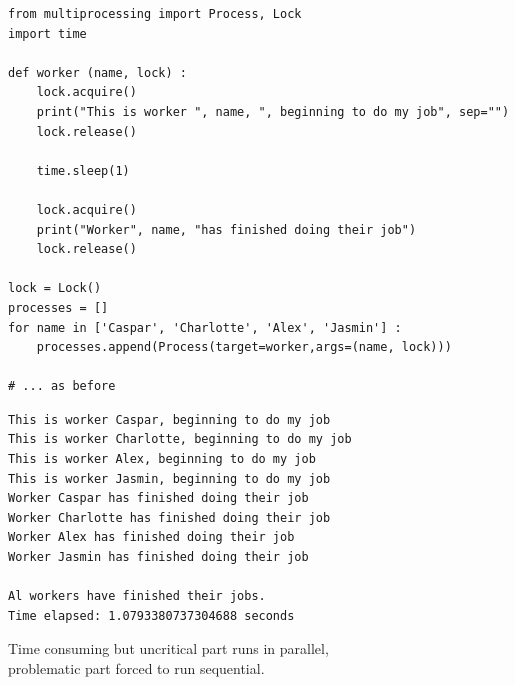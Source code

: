 
\begin{frame}[fragile]
%
\begin{codebox}
\begin{verbatim}
from multiprocessing import Process, Lock
import time

def worker (name, lock) :
    lock.acquire()
    print("This is worker ", name, ", beginning to do my job", sep="")
    lock.release()
    
    time.sleep(1)
    
    lock.acquire()
    print("Worker", name, "has finished doing their job")
    lock.release()

lock = Lock()
processes = []
for name in ['Caspar', 'Charlotte', 'Alex', 'Jasmin'] :
    processes.append(Process(target=worker,args=(name, lock)))

# ... as before
\end{verbatim}
\end{codebox}
%
\end{frame}


\begin{frame}[fragile]
%
\begin{cmdbox}
\begin{verbatim}
This is worker Caspar, beginning to do my job
This is worker Charlotte, beginning to do my job
This is worker Alex, beginning to do my job
This is worker Jasmin, beginning to do my job
Worker Caspar has finished doing their job
Worker Charlotte has finished doing their job
Worker Alex has finished doing their job
Worker Jasmin has finished doing their job

Al workers have finished their jobs.
Time elapsed: 1.0793380737304688 seconds
\end{verbatim}
\end{cmdbox}

\begin{center}
\Thus Time consuming but uncritical part runs in parallel,\\
	problematic part forced to run sequential.
\end{center}
%
\end{frame}

